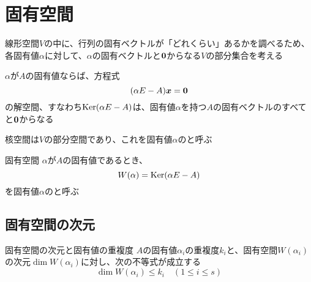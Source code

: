 \documentclass[../../../topic_linear-algebra]{subfiles}
\begin{document}
\sectionline
\section{固有空間}

線形空間$V$の中に、行列の固有ベクトルが「どれくらい」あるかを調べるため、各固有値$\alpha$に対して、$\alpha$の固有ベクトルと$\vb*{0}$からなる$V$の部分集合を考える

\br

$\alpha$が$A$の固有値ならば、方程式
\begin{equation*}
  (\alpha E - A)\vb*{x} = \vb*{0}
\end{equation*}
の解空間、すなわち$\operatorname{Ker}(\alpha E - A)$は、固有値$\alpha$を持つ$A$の固有ベクトルのすべてと$\vb*{0}$からなる

\br

核空間は$V$の部分空間であり、これを固有値$\alpha$のと呼ぶ

\begin{definition}{固有空間}
  $\alpha$が$A$の固有値であるとき、
  \begin{equation*}
    W(\alpha) = \operatorname{Ker}(\alpha E - A)
  \end{equation*}
  を固有値$\alpha$のと呼ぶ
\end{definition}

\subsection{固有空間の次元}

\begin{theorem}{固有空間の次元と固有値の重複度}
  $A$の固有値$\alpha_i$の重複度$k_i$と、固有空間$W(\alpha_i)$の次元$\dim W(\alpha_i)$に対し、次の不等式が成立する
  \begin{equation*}
    \dim W(\alpha_i) \leq k_i \quad (1 \leq i \leq s)
  \end{equation*}
\end{theorem}
\end{document}
